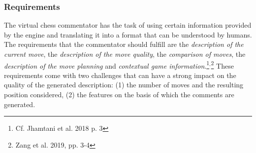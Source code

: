 \subsubsection{Requirements}

The virtual chess commentator has the task of using certain information provided by the engine and translating it into a format that can be understood by humans. The requirements that the commentator should fulfill are the \textit{description of the current move}, the \textit{description of the move quality}, the \textit{comparison of moves}, the \textit{description of the move planning} and \textit{contextual game information}.\footnote{Cf. Jhamtani et al. 2018 p. 3}$^{,}$\footnote{Zang et al. 2019, pp. 3-4} These requirements come with two challenges that can have a strong impact on the quality of the generated description: (1) the number of moves and the resulting position considered, (2) the features on the basis of which the comments are generated. 




